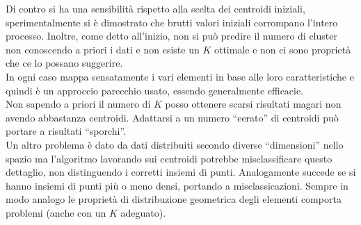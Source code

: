 Di contro si ha una sensibilità rispetto alla scelta dei centroidi
iniziali, sperimentalmente si è dimostrato che brutti valori iniziali corrompano
l'intero processo. Inoltre, come detto all'inizio, non si può predire il numero
di cluster non conoscendo a priori i dati e non esiste un $K$ ottimale e non ci
sono proprietà che ce lo possano suggerire. \\
In ogni caso mappa sensatamente i vari elementi in base alle loro
caratteristiche e quindi è un approccio parecchio usato, essendo generalmente
efficacie.\\
Non sapendo a priori il numero di $K$ posso ottenere scarsi risultati magari non
avendo abbastanza centroidi. Adattarsi a un numero
``eerato'' di centroidi può portare a risultati ``sporchi''. \\
Un altro problema è dato da dati distribuiti secondo diverse ``dimensioni''
nello spazio ma l'algoritmo lavorando sui centroidi potrebbe misclassificare
questo dettaglio, non distinguendo i corretti insiemi di punti. Analogamente
succede se si hanno insiemi di punti più o meno densi, portando a
misclassicazioni. Sempre in modo analogo le proprietà di distribuzione
geometrica degli elementi comporta problemi (anche con un $K$ adeguato).

